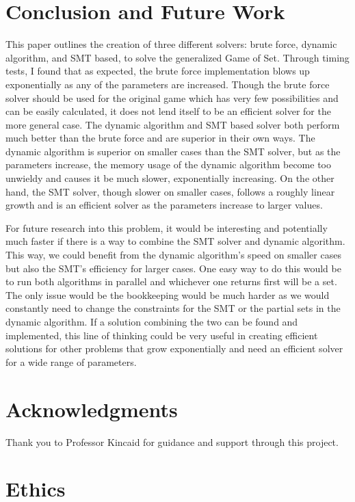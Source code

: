 \documentclass[pageno]{jpaper}
\begin{document}
\section{Conclusion and Future Work}


This paper outlines the creation of three different solvers: brute force, dynamic algorithm, and SMT based, to solve the generalized Game of Set. Through timing tests, I found that as expected, the brute force implementation blows up exponentially as any of the parameters are increased. Though the brute force solver should be used for the original game which has very few possibilities and can be easily calculated, it does not lend itself to be an efficient solver for the more general case. The dynamic algorithm and SMT based solver both perform much better than the brute force and are superior in their own ways. The dynamic algorithm is superior on smaller cases than the SMT solver, but as the parameters increase, the memory usage of the dynamic algorithm become too unwieldy and causes it be much slower, exponentially increasing. On the other hand, the SMT solver, though slower on smaller cases, follows a roughly linear growth and is an efficient solver as the parameters increase to larger values. 


For future research into this problem, it would be interesting and potentially much faster if there is a way to combine the SMT solver and dynamic algorithm. This way, we could benefit from the dynamic algorithm's speed on smaller cases but also the SMT's efficiency for larger cases. One easy way to do this would be to run both algorithms in parallel and whichever one returns first will be a set. The only issue would be the bookkeeping would be much harder as we would constantly need to change the constraints for the SMT or the partial sets in the dynamic algorithm. If a solution combining the two can be found and implemented, this line of thinking could be very useful in creating efficient solutions for other problems that grow exponentially and need an efficient solver for a wide range of parameters. 

\section{Acknowledgments}

Thank you to Professor Kincaid for guidance and support through this project. 

\section{Ethics}
\end{document}
